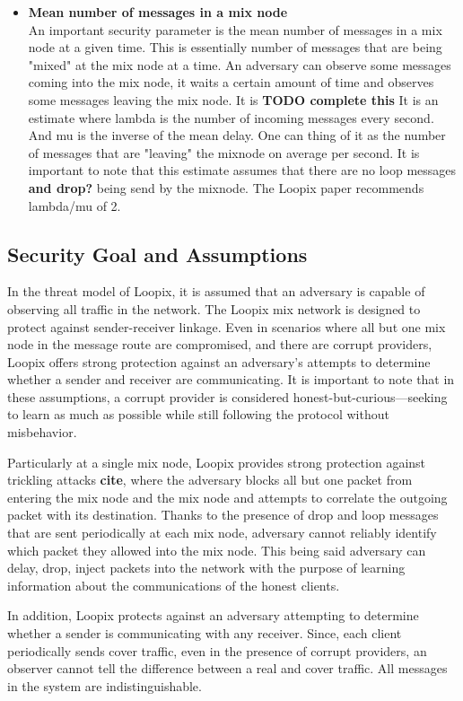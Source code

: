 \documentclass[a4paper,11pt,oneside]{report}
\begin{document}
\begin{itemize}
\item \textbf{Mean number of messages in a mix node} \\
\label{item:lambda_over_mu}
An important security parameter is the mean number of messages in a mix node at a given time. This is essentially number of messages that are being "mixed" at the mix node at a time. An adversary can observe some messages coming into the mix node, it waits a certain amount of time and observes some messages leaving the mix node. It is  \textbf{TODO complete this}
It is an estimate where lambda is the number of incoming messages every second. And mu is the inverse of the mean delay. One can thing of it as the number of messages that are "leaving" the mixnode on average per second. It is important to note that this estimate assumes that there are no loop messages \textbf{and drop?} being send by the mixnode. The Loopix paper recommends lambda/mu of 2. 
\end{itemize}

\subsection{Security Goal and Assumptions}
\label{sec:loopix_assumptions}
In the threat model of Loopix, it is assumed that an adversary is capable of observing all traffic in the network. The Loopix mix network is designed to protect against sender-receiver linkage. Even in scenarios where all but one mix node in the message route are compromised, and there are corrupt providers, Loopix offers strong protection against an adversary's attempts to determine whether a sender and receiver are communicating. It is important to note that in these assumptions, a corrupt provider is considered honest-but-curious—seeking to learn as much as possible while still following the protocol without misbehavior.

Particularly at a single mix node, Loopix provides strong protection against trickling attacks \textbf{cite}, where the adversary blocks all but one packet from entering the mix node and the mix node and attempts to correlate the outgoing packet with its destination. Thanks to the presence of drop and loop messages that are sent periodically at each mix node, adversary cannot reliably identify which packet they allowed into the mix node. This being said adversary can delay, drop, inject packets into the network with the purpose of learning information about the communications of the honest clients.

In addition, Loopix protects against an adversary attempting to determine whether a sender is communicating with any receiver. Since, each client periodically sends cover traffic, even in the presence of corrupt providers, an observer cannot tell the difference between a real and cover traffic. All messages in the system are indistinguishable.
\end{document}
